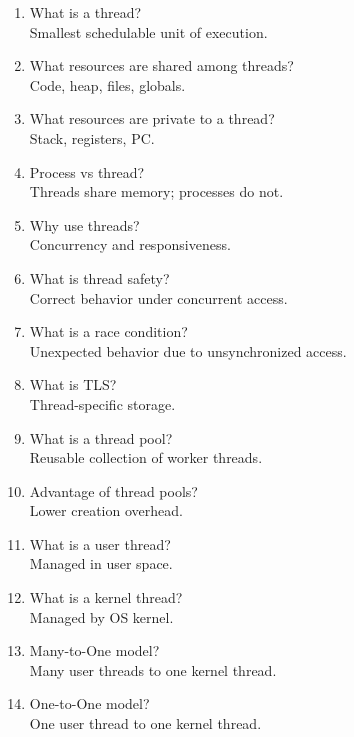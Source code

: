 \begin{enumerate}
\item What is a thread?\\
Smallest schedulable unit of execution.

\item What resources are shared among threads?\\
Code, heap, files, globals.

\item What resources are private to a thread?\\
Stack, registers, PC.

\item Process vs thread?\\
Threads share memory; processes do not.

\item Why use threads?\\
Concurrency and responsiveness.

\item What is thread safety?\\
Correct behavior under concurrent access.

\item What is a race condition?\\
Unexpected behavior due to unsynchronized access.

\item What is TLS?\\
Thread-specific storage.

\item What is a thread pool?\\
Reusable collection of worker threads.

\item Advantage of thread pools?\\
Lower creation overhead.

\item What is a user thread?\\
Managed in user space.

\item What is a kernel thread?\\
Managed by OS kernel.

\item Many-to-One model?\\
Many user threads to one kernel thread.

\item One-to-One model?\\
One user thread to one kernel thread.


\end{enumerate}

